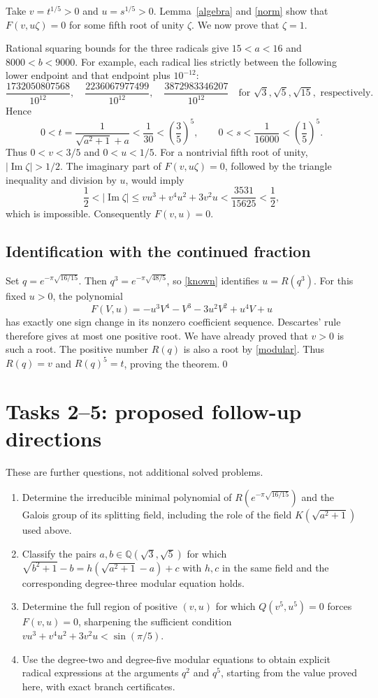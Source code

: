 \documentclass[11pt]{article}
\begin{document}
Take $v=t^{1/5}>0$ and $u=s^{1/5}>0$.
Lemma~\ref{algebra} and \eqref{norm} show that
$F(v,u\zeta)=0$ for some fifth root of unity $\zeta$.
We now prove that $\zeta=1$.

Rational squaring bounds for the three radicals give $15<a<16$ and
$8000<b<9000$. For example, each radical lies strictly between the
following lower endpoint and that endpoint plus $10^{-12}$:
\[
 \frac{1732050807568}{10^{12}},\quad
 \frac{2236067977499}{10^{12}},\quad
 \frac{3872983346207}{10^{12}}
 \quad\text{for }\sqrt3,\sqrt5,\sqrt{15},\text{ respectively}.
\]
Hence
\[
 0<t=\frac1{\sqrt{a^2+1}+a}<\frac1{30}<\left(\frac35\right)^5,
 \qquad
 0<s<\frac1{16000}<\left(\frac15\right)^5.
\]
Thus $0<v<3/5$ and $0<u<1/5$.
For a nontrivial fifth root of unity, $|\operatorname{Im}\zeta|>1/2$.
The imaginary part of $F(v,u\zeta)=0$, followed by the triangle
inequality and division by $u$, would imply
\[
 \frac12<|\operatorname{Im}\zeta|
 \le vu^3+v^4u^2+3v^2u
 <\frac{3531}{15625}<\frac12,
\]
which is impossible. Consequently $F(v,u)=0$.

\subsection*{Identification with the continued fraction}
Set $q=e^{-\pi\sqrt{16/15}}$. Then
$q^3=e^{-\pi\sqrt{48/5}}$, so \eqref{known} identifies $u=R(q^3)$.
For this fixed $u>0$, the polynomial
\[
 F(V,u)=-u^3V^4-V^3-3u^2V^2+u^4V+u
\]
has exactly one sign change in its nonzero coefficient sequence.
Descartes' rule therefore gives at most one positive root.
We have already proved that $v>0$ is such a root. The positive number
$R(q)$ is also a root by \eqref{modular}. Thus $R(q)=v$ and
$R(q)^5=t$, proving the theorem.\qed

\section*{Tasks 2--5: proposed follow-up directions}
These are further questions, not additional solved problems.
\begin{enumerate}[start=2,label=\textbf{Task \arabic*:},leftmargin=*]
\item Determine the irreducible minimal polynomial of
$R(e^{-\pi\sqrt{16/15}})$ and the Galois group of its splitting field,
including the role of the field $K(\sqrt{a^2+1})$ used above.
\item Classify the pairs $a,b\in\mathbb Q(\sqrt3,\sqrt5)$ for which
$\sqrt{b^2+1}-b=h(\sqrt{a^2+1}-a)+c$ with $h,c$ in the same field
and the corresponding degree-three modular equation holds.
\item Determine the full region of positive $(v,u)$ for which
$Q(v^5,u^5)=0$ forces $F(v,u)=0$, sharpening the sufficient
condition $vu^3+v^4u^2+3v^2u<\sin(\pi/5)$.
\item Use the degree-two and degree-five modular equations to obtain
explicit radical expressions at the arguments $q^2$ and $q^5$,
starting from the value proved here, with exact branch certificates.
\end{enumerate}
\end{document}
